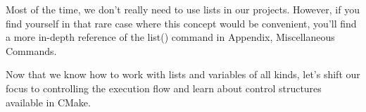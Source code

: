 Most of the time, we don’t really need to use lists in our projects. However, if you find yourself in that rare case where this concept would be convenient, you’ll find a more in-depth reference of the list() command in Appendix, Miscellaneous Commands.

Now that we know how to work with lists and variables of all kinds, let’s shift our focus to controlling the execution flow and learn about control structures available in CMake.
















